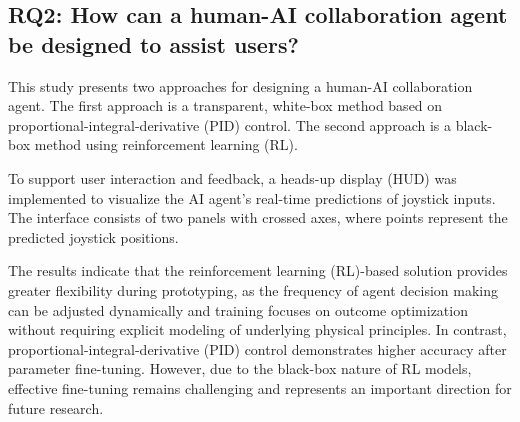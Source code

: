\subsection{RQ2: How can a human-AI collaboration agent be designed to assist users?}

This study presents two approaches for designing a human-AI collaboration agent. The first approach is a transparent, white-box method based on proportional-integral-derivative (PID) control. The second approach is a black-box method using reinforcement learning (RL).

To support user interaction and feedback, a heads-up display (HUD) was implemented to visualize the AI agent's real-time predictions of joystick inputs. The interface consists of two panels with crossed axes, where points represent the predicted joystick positions. 

The results indicate that the reinforcement learning (RL)-based solution provides greater flexibility during prototyping, as the frequency of agent decision making can be adjusted dynamically and training focuses on outcome optimization without requiring explicit modeling of underlying physical principles. In contrast, proportional-integral-derivative (PID) control demonstrates higher accuracy after parameter fine-tuning. However, due to the black-box nature of RL models, effective fine-tuning remains challenging and represents an important direction for future research.